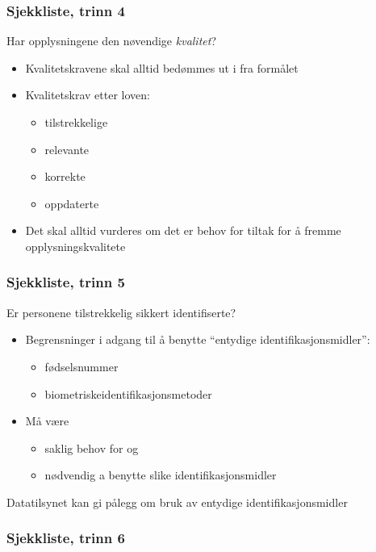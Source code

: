 \documentclass[11pt]{article}
\begin{document}
\subsubsection{Sjekkliste, trinn 4}
\label{sec-18.1.4}

    Har opplysningene den nøvendige \emph{kvalitet}? 
\begin{itemize}
\item Kvalitetskravene skal alltid bedømmes ut i fra formålet
\item Kvalitetskrav etter loven:

\begin{itemize}
\item tilstrekkelige
\item relevante
\item korrekte
\item oppdaterte
\end{itemize}

\item Det skal alltid vurderes om det er behov for tiltak for å fremme opplysningskvalitete
\end{itemize}
\subsubsection{Sjekkliste, trinn 5}
\label{sec-18.1.5}

    Er personene tilstrekkelig sikkert identifiserte?
\begin{itemize}
\item Begrensninger i adgang til å benytte “entydige identifikasjonsmidler”:

\begin{itemize}
\item fødselsnummer
\item biometriskeidentifikasjonsmetoder
\end{itemize}

\item Må være

\begin{itemize}
\item saklig behov for og
\item nødvendig a benytte slike identifikasjonsmidler
\end{itemize}

\end{itemize}
    Datatilsynet kan gi pålegg om bruk av entydige identifikasjonsmidler
\subsubsection{Sjekkliste, trinn 6}
\label{sec-18.1.6}
\end{document}
